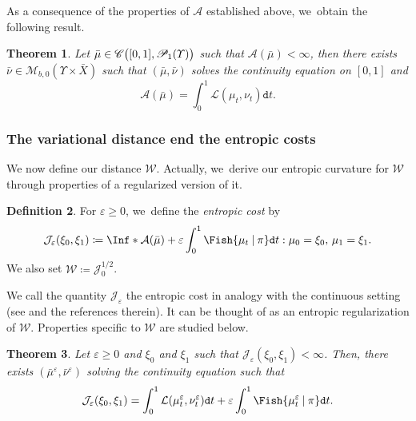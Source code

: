 \documentclass[10pt]{amsart}
\newtheorem{theorem}{Theorem}[section]
\theoremstyle{definition}
\newtheorem{definition}[theorem]{Definition}
\theoremstyle{remark}
\DeclarePairedDelimiter{\paren}{\lparen}{\rparen}
\newcommand{\given}[1][]{%
\nonscript\:#1\vert
\allowbreak
\nonscript\:
\mathopen{}}
\begin{document}
As a consequence of the properties of $\mathcal{A}$ established above, we~obtain the following result.

\begin{theorem}\label{t:action-minizers}
Let $\bar{\mu} \in \mathscr{C}\paren[\big]{[0,1], \mathscr{P}_{1}(\varUpsilon)}$ such that $\mathcal{A}(\bar{\mu}) < \infty$, then there exists $\bar{\nu} \in \mathscr{M}_{b,0}(\varUpsilon \times \bar{X})$ such that $(\bar{\mu}, \bar{\nu})$ solves the continuity equation on $[0,1]$ and
\begin{equation*}
\mathcal{A}(\bar{\mu}) = \int_{0}^{1} \mathcal{L}(\mu_{t}, \nu_{t}) \mathtt{d} t.
\end{equation*}
\end{theorem}

\subsubsection{The variational distance end the entropic costs}

We now define our distance $\mathcal{W}$.
Actually, we~derive our entropic curvature for $\mathcal{W}$ through properties of a regularized version of it.
\begin{definition}
For $\varepsilon \geq 0$, we~define the \emph{entropic cost} by
\begin{equation*}
\mathcal{J}_{\varepsilon}(\xi_{0}, \xi_{1}) \coloneq \Inf*{ \mathcal{A}(\bar{\mu}) + \varepsilon \int_{0}^{1} \Fish{ \mu_{t} \given \pi } \mathtt{d} t : \mu_{0} = \xi_{0},\, \mu_{1} = \xi_{1} }.
\end{equation*}
We also set $\mathcal{W} \coloneq \mathcal{J}_{0}^{1/2}$.
\end{definition}
We call the quantity $\mathcal{J}_{\varepsilon}$ the entropic cost in analogy with the continuous setting (see \cite{GigliTamanini} and the references therein).
It can be thought of as an entropic regularization of $\mathcal{W}$.
Properties specific to $\mathcal{W}$ are studied below.

\begin{theorem}\label{t:minimizing-curve}
Let $\varepsilon \geq 0$ and $\xi_{0}$ and $\xi_{1}$ such that $\mathcal{J}_{\varepsilon}(\xi_{0}, \xi_{1}) < \infty$.
Then, there exists $(\bar{\mu}^{\varepsilon}, \bar{\nu}^{\varepsilon})$ solving the continuity equation such that
\begin{equation*}
\mathcal{J}_{\varepsilon}(\xi_{0}, \xi_{1}) = \int_{0}^{1} \mathcal{L}(\mu^{\varepsilon}_{t}, \nu^{\varepsilon}_{t}) \mathtt{d} t + \varepsilon \int_{0}^{1} \Fish{ \mu^{\varepsilon}_{t} \given \pi } \mathtt{d} t.
\end{equation*}
\end{theorem}
\end{document}
